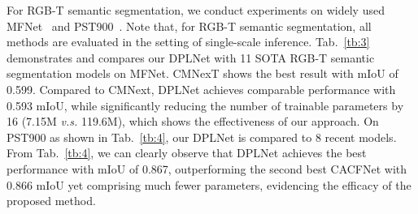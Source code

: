 \documentclass[10pt,twocolumn,letterpaper]{article}
\begin{document}
\vspace{0.3em}
 For RGB-T semantic segmentation, we conduct experiments on widely used MFNet~\cite{mfnet} and PST900~\cite{pst900}. Note that, for RGB-T semantic segmentation, all methods are evaluated in the setting of single-scale inference. Tab.~\ref{tb:3} demonstrates and compares our DPLNet with 11 SOTA RGB-T semantic segmentation models on MFNet. CMNexT shows the best result with mIoU of 0.599. Compared to CMNext, DPLNet achieves comparable performance with 0.593 mIoU, while significantly reducing the number of trainable parameters by 16 (7.15M \emph{v.s.} 119.6M), which shows the effectiveness of our approach. On PST900 as shown in Tab.~\ref{tb:4}, our DPLNet is compared to 8 recent models. From Tab.~\ref{tb:4}, we can clearly observe that DPLNet achieves the best performance with mIoU of 0.867, outperforming the second best CACFNet with 0.866 mIoU yet comprising much fewer parameters, evidencing the efficacy of the proposed method.


\begin{table}[!t]
\Large
\centering
\setlength{\tabcolsep}{10pt}
\renewcommand{\arraystretch}{1.05}
\caption{\centering RGB-T video semantic segmentation results on MVSeg.}
\label{tb:7}
\vspace{-4mm}
\end{table}
\end{document}
